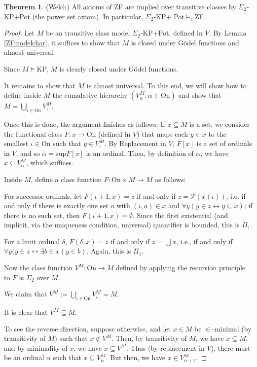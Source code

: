 \documentclass[a4paper,12pt]{amsart}
\theoremstyle{definition}
\newtheorem{thm}[fact]{Theorem}
\begin{document}
\begin{thm}{\label{sigma2-kp is enough}}
(Welch) All axioms of ZF are implied over transitive classes by $\Sigma_{2}$-KP+Pot (the power set axiom). In particular, $\Sigma_{2}$-KP+ Pot$\models_{c}$ZF.
\end{thm}
\begin{proof}
Let $M$ be an transitive class model $\Sigma_2$-KP+Pot, defined in $V$. 
By Lemma \ref{ZFmodelchar}, it suffices to show that $M$ is closed under G\"odel functions and almost universal. 

Since $M\models$KP, $M$ is clearly closed under G\"odel functions. 

It remains to show that $M$ is almost universal. 
To this end, we will show how to define inside $M$ the cumulative hierarchy $(V_{\alpha}^{M}:\alpha\in\text{On})$ and show that 
$M=\bigcup_{\iota\in\text{On}}V^{M}_{\iota}$. 


Once this is done, the argument finishes as follows: If $x\subseteq M$ is a set, we consider the functional class $F:x\rightarrow\text{On}$ (defined in $V$) that maps each $y\in x$ to the smallest $\iota\in\text{On}$ 
such that $y\in V^{M}_{\iota}$. 
By Replacement in $V$, $F[x]$ is a set of ordinals in $V$, and so $\alpha=\text{sup}F[x]$ is an ordinal. Then, by definition of $\alpha$, we have $x\subseteq V^{M}_{\alpha}$, which suffices. 


Inside $M$, define a class function $F:\text{On}\times M\rightarrow M$ as follows:
 
For successor ordinals, let $F(\iota+1,x)=z$ if and only if $z=\mathcal{P}(x(\iota))$, i.e. if and only if there is exactly one set $a$ with $(\iota,a)\in x$ and $\forall{y}(y\in z\leftrightarrow y\subseteq x)$; if there is no such set, then $F(\iota+1,x)=\emptyset$. 
Since the first existential (and implicit, via the uniqueness condition, universal) quantifier is bounded, this is $\Pi_1$.

For a limit ordinal $\delta$, $F(\delta,x)=z$ if and only if $z=\bigcup{x}$, i.e., if and only if $\forall{y}(y\in z\leftrightarrow\exists{b\in x}(y\in b)$. Again, this is $\Pi_1$. 

Now the class function $V^{M}:\text{On}\rightarrow M$ defined by applying the recursion principle to $F$ is $\Sigma_2$ over $M$. 


We claim that $V^{M}:=\bigcup_{\iota\in\text{On}}V^{M}_{\iota}=M$. 

It is clear that 
$V^{M}\subseteq M$. 

To see the reverse direction, suppose otherwise, and let $x\in M$ be $\in$-minimal (by transitivity of $M$) such that $x\notin V^{M}$. 
Then, by transitivity of $M$, we have $x\subseteq M$, and by minimality of $x$, we have $x\subseteq V^{M}$. Thus (by replacement in $V$), there must be an ordinal $\alpha$ such that $x\subseteq V^{M}_{\alpha}$. But then, we have $x\in V^{M}_{\alpha+1}$.



\end{proof}
\end{document}
